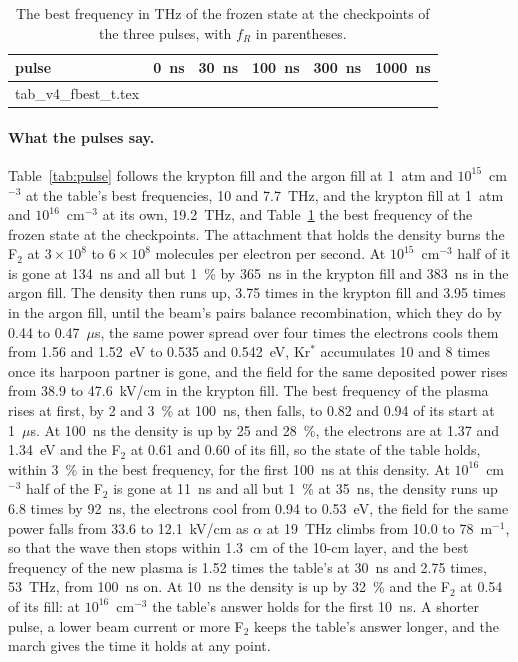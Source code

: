 \documentclass[11pt]{article}
\makeatletter
\newcommand{\tabinput}[1]{\@@input #1 }
\makeatother
\begin{document}
\begin{table}[!tbp]
\caption{The best frequency in THz of the frozen state at the checkpoints of the three pulses, with $f_R$ in
parentheses.}
\label{tab:fbest_t}
\centering
\small
\begin{tabular}{@{}lrrrrr@{}}
\toprule
pulse & 0~ns & 30~ns & 100~ns & 300~ns & 1000~ns \\
\midrule
\tabinput{tab_v4_fbest_t.tex}
\bottomrule
\end{tabular}
\end{table}

\paragraph{What the pulses say.}
Table~\ref{tab:pulse} follows the krypton fill and the argon fill at 1~atm and $10^{15}$~cm$^{-3}$ at the
table's best frequencies, 10 and 7.7~THz, and the krypton fill at 1~atm and $10^{16}$~cm$^{-3}$ at its own,
19.2~THz, and Table~\ref{tab:fbest_t} the best frequency of the frozen state at the checkpoints. The attachment
that holds the density burns the F$_2$ at $3\times10^{8}$ to $6\times10^{8}$ molecules per electron per second. At
$10^{15}$~cm$^{-3}$ half of it is gone at 134~ns and all but 1~\% by 365~ns in the krypton fill and 383~ns in the
argon fill. The density then runs up, 3.75 times in the krypton fill and 3.95 times in the argon fill, until the
beam's pairs balance recombination, which they do by 0.44 to 0.47~$\mu$s, the same power spread over four times
the electrons cools them from 1.56 and 1.52~eV to 0.535 and 0.542~eV, Kr$^*$ accumulates 10 and 8 times once its
harpoon partner is gone, and the field for the same deposited power rises from 38.9 to 47.6~kV/cm in the krypton
fill. The best frequency of the plasma rises at first, by 2 and 3~\% at 100~ns, then falls, to 0.82 and 0.94 of
its start at 1~$\mu$s. At 100~ns the density is up by 25 and 28~\%, the electrons are at 1.37 and 1.34~eV and the
F$_2$ at 0.61 and 0.60 of its fill, so the state of the table holds, within 3~\% in the best frequency, for the
first 100~ns at this density. At $10^{16}$~cm$^{-3}$ half of the F$_2$ is gone at 11~ns and all but 1~\% at
35~ns, the density runs up 6.8 times by 92~ns, the electrons cool from 0.94 to 0.53~eV, the field for the same
power falls from 33.6 to 12.1~kV/cm as $\alpha$ at 19~THz climbs from 10.0 to 78~m$^{-1}$, so that the wave then
stops within 1.3~cm of the 10-cm layer, and the best frequency of the new plasma is 1.52 times the table's at 30~ns
and 2.75 times, 53~THz, from 100~ns on. At 10~ns the density is up by 32~\% and the F$_2$ at 0.54 of its fill: at
$10^{16}$~cm$^{-3}$ the table's answer holds for the first 10~ns. A shorter pulse, a lower beam current or more
F$_2$ keeps the table's answer longer, and the march gives the time it holds at any point.
\end{document}

